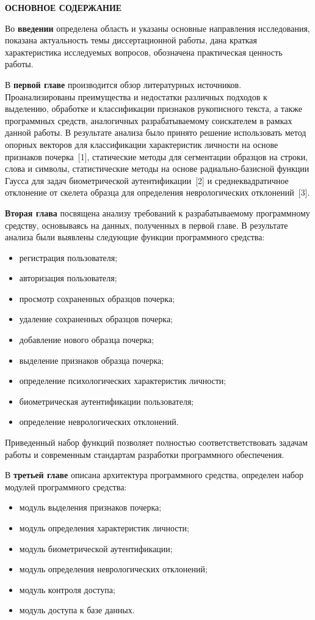\begin{center}
{\bfseries ОСНОВНОЕ СОДЕРЖАНИЕ}
\end{center}

Во \textbf{введении} определена область и указаны основные направления исследования, показана актуальность темы диссертационной работы, дана краткая характеристика исследуемых вопросов, обозначена практическая ценность работы.

В \textbf{первой главе} производится обзор литературных источников. Проанализированы преимущества и недостатки различных подходов к выделению, обработке и классификации признаков рукописного текста, а также программных средств, аналогичных разрабатываемому соискателем в рамках данной работы. В результате анализа было принято решение использовать метод опорных векторов для классификации характеристик личности на основе признаков почерка~[1], статические методы для сегментации образцов на строки, слова и символы, статистические методы на основе радиально-базисной функции Гаусса для задач биометрической аутентификации~[2] и среднеквадратичное отклонение от скелета образца для определения неврологических отклонений~[3].

\textbf{Вторая глава} посвящена анализу требований к разрабатываемому программному средству, основываясь на данных, полученных в первой главе. В результате анализа были выявлены следующие функции программного средства:
\begin{itemize}
	\item регистрация пользователя;
	\item авторизация пользователя;
	\item просмотр сохраненных образцов почерка;
	\item удаление сохраненных образцов почерка;
	\item добавление нового образца почерка;
	\item выделение признаков образца почерка;
	\item определение психологических характеристик личности;
	\item биометрическая аутентификации пользователя;
	\item определение неврологических отклонений.
\end{itemize}

Приведенный набор функций позволяет полностью соответстветствовать задачам работы и современным стандартам разработки программного обеспечения.

В \textbf{третьей главе} описана архитектура программного средства, определен набор модулей программного средства:
\begin{itemize}
    \item модуль выделения признаков почерка;
    \item модуль определения характеристик личности;
    \item модуль биометрической аутентификации;
    \item модуль определения неврологических отклонений;
    \item модуль контроля доступа;
    \item модуль доступа к базе данных.
\end{itemize}

